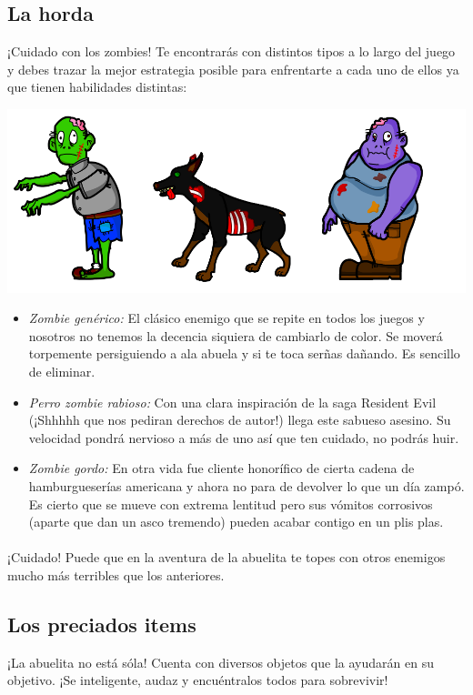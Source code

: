 \subsection{La horda}
¡Cuidado con los zombies! Te encontrarás con distintos tipos a lo largo del juego y debes trazar la mejor estrategia posible para enfrentarte a cada uno de ellos ya que tienen habilidades distintas:

\begin{center}
	\includegraphics[scale=0.35]{enemigos.png}
\end{center}

\begin{itemize}
	\item \emph{Zombie genérico:} El clásico enemigo que se repite en todos los juegos y nosotros no tenemos la decencia siquiera de cambiarlo de color. Se moverá torpemente persiguiendo a ala abuela y si te toca serñas dañando. Es sencillo de eliminar.
	\item \emph{Perro zombie rabioso:} Con una clara inspiración de la saga Resident Evil (¡Shhhhh que nos pediran derechos de autor!) llega este sabueso asesino. Su velocidad pondrá nervioso a más de uno así que ten cuidado, no podrás huir.
	\item \emph{Zombie gordo:} En otra vida fue cliente honorífico de cierta cadena de hamburgueserías americana y ahora no para de devolver lo que un día zampó. Es cierto que se mueve con extrema lentitud pero sus vómitos corrosivos (aparte que dan un asco tremendo) pueden acabar contigo en un plis plas.
\end{itemize}

\paragraph{}
¡Cuidado! Puede que en la aventura de la abuelita te topes con otros enemigos mucho más terribles que los anteriores.

\subsection{Los preciados items}
¡La abuelita no está sóla! Cuenta con diversos objetos que la ayudarán en su objetivo. ¡Se inteligente, audaz y encuéntralos todos para sobrevivir!

